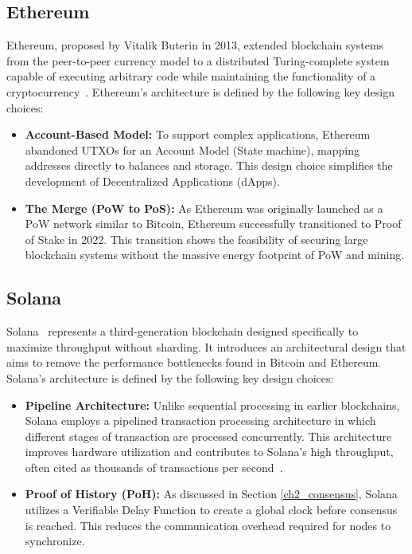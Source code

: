 \subsection{Ethereum}
Ethereum, proposed by Vitalik Buterin in 2013, extended blockchain systems from the peer-to-peer currency model to a distributed Turing-complete system capable of executing arbitrary code while maintaining the functionality of a cryptocurrency~\cite{formal2025beacon}. Ethereum's architecture is defined by the following key design choices:

\begin{itemize}
    \item \textbf{Account-Based Model:} To support complex applications, Ethereum abandoned UTXOs for an Account Model (State machine), mapping addresses directly to balances and storage. This design choice simplifies the development of Decentralized Applications (dApps).
    \item \textbf{The Merge (PoW to PoS):} As Ethereum was originally launched as a PoW network similar to Bitcoin, Ethereum successfully transitioned to Proof of Stake in 2022. This transition shows the feasibility of securing large blockchain systems without the massive energy footprint of PoW and mining.
\end{itemize}

\subsection{Solana}
Solana~\cite{mishra2024solana} represents a third-generation blockchain designed specifically to maximize throughput without sharding. It introduces an architectural design that aims to remove the performance bottlenecks found in Bitcoin and Ethereum. Solana's architecture is defined by the following key design choices:

\begin{itemize}
    \item \textbf{Pipeline Architecture:} Unlike sequential processing in earlier blockchains, Solana employs a pipelined transaction processing architecture in which different stages of transaction are processed concurrently. This architecture improves hardware utilization and contributes to Solana’s high throughput, often cited as thousands of transactions per second~\cite{mishra2024solana}. 
    \item \textbf{Proof of History (PoH):} As discussed in Section \ref{ch2_consensus}, Solana utilizes a Verifiable Delay Function to create a global clock before consensus is reached. This reduces the communication overhead required for nodes to synchronize.
\end{itemize}


